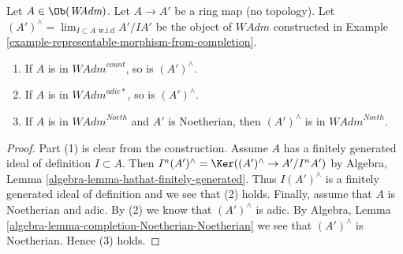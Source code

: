 \begin{lemma}
\label{lemma-completion-in-sub}
Let $A \in \Ob(\textit{WAdm})$. Let $A \to A'$ be a ring
map (no topology). Let $(A')^\wedge = \lim_{I \subset A\text{ w.i.d}} A'/IA'$
be the object of $\textit{WAdm}$ constructed in
Example \ref{example-representable-morphism-from-completion}.
\begin{enumerate}
\item If $A$ is in $\textit{WAdm}^{count}$, so is $(A')^\wedge$.
\item If $A$ is in $\textit{WAdm}^{adic*}$, so is $(A')^\wedge$.
\item If $A$ is in $\textit{WAdm}^{Noeth}$ and $A'$ is Noetherian, then
$(A')^\wedge$ is in $\textit{WAdm}^{Noeth}$.
\end{enumerate}
\end{lemma}

\begin{proof}
Part (1) is clear from the construction.
Assume $A$ has a finitely generated ideal of definition $I \subset A$.
Then $I^n(A')^\wedge =  \Ker((A')^\wedge \to A'/I^nA')$ by Algebra, Lemma
\ref{algebra-lemma-hathat-finitely-generated}.
Thus $I(A')^\wedge$ is a finitely generated ideal of definition
and we see that (2) holds.
Finally, assume that $A$ is Noetherian and adic.
By (2) we know that $(A')^\wedge$ is adic.
By Algebra, Lemma \ref{algebra-lemma-completion-Noetherian-Noetherian}
we see that $(A')^\wedge$ is Noetherian. Hence (3) holds.
\end{proof}

